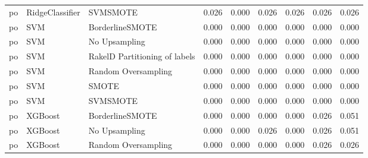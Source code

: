 \begin{tabular}{lllllllll}
      po &                 RidgeClassifier &                      SVMSMOTE &     0.026 &                     0.000 &                 0.026 &                  0.026 &                                   0.026 &     0.026 \\
      po &                             SVM &               BorderlineSMOTE &     0.000 &                     0.000 &                 0.000 &                  0.000 &                                   0.000 &     0.000 \\
      po &                             SVM &                 No Upsampling &     0.000 &                     0.000 &                 0.000 &                  0.000 &                                   0.000 &     0.000 \\
      po &                             SVM & RakelD Partitioning of labels &     0.000 &                     0.000 &                 0.000 &                  0.000 &                                   0.000 &     0.000 \\
      po &                             SVM &           Random Oversampling &     0.000 &                     0.000 &                 0.000 &                  0.000 &                                   0.000 &     0.000 \\
      po &                             SVM &                         SMOTE &     0.000 &                     0.000 &                 0.000 &                  0.000 &                                   0.000 &     0.000 \\
      po &                             SVM &                      SVMSMOTE &     0.000 &                     0.000 &                 0.000 &                  0.000 &                                   0.000 &     0.000 \\
      po &                         XGBoost &               BorderlineSMOTE &     0.000 &                     0.000 &                 0.000 &                  0.000 &                                   0.026 &     0.051 \\
      po &                         XGBoost &                 No Upsampling &     0.000 &                     0.000 &                 0.026 &                  0.000 &                                   0.026 &     0.051 \\
      po &                         XGBoost &           Random Oversampling &     0.000 &                     0.000 &                 0.000 &                  0.000 &                                   0.026 &     0.026 \\

\end{tabular}
